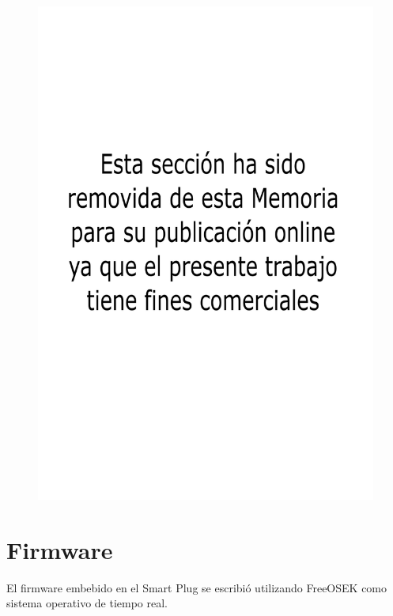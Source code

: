 \begin{figure}[!h]
	\centering
	\includegraphics[width=14cm]{./Figures/comercial.png}
\end{figure}

\section{Firmware}

El firmware embebido en el Smart Plug se escribió utilizando FreeOSEK como sistema operativo de tiempo real. 

